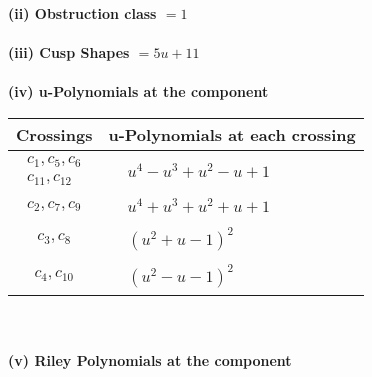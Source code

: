 \documentclass[1p]{elsarticle_modified}
\theoremstyle{definition}
\begin{document}
\flushleft \textbf{(ii) Obstruction class $= 1$}\\~\\
\flushleft \textbf{(iii) Cusp Shapes $= 5 u+11$}\\~\\
\newpage\renewcommand{\arraystretch}{1}
\flushleft \textbf{(iv) u-Polynomials at the component}\newline \\
\begin{tabular}{m{50pt}|m{274pt}}
Crossings & \hspace{64pt}u-Polynomials at each crossing \\
\hline $$\begin{aligned}c_{1},c_{5},c_{6}\\c_{11},c_{12}\end{aligned}$$&$\begin{aligned}
&u^4- u^3+u^2- u+1
\end{aligned}$\\
\hline $$\begin{aligned}c_{2},c_{7},c_{9}\end{aligned}$$&$\begin{aligned}
&u^4+u^3+u^2+u+1
\end{aligned}$\\
\hline $$\begin{aligned}c_{3},c_{8}\end{aligned}$$&$\begin{aligned}
&(u^2+u-1)^2
\end{aligned}$\\
\hline $$\begin{aligned}c_{4},c_{10}\end{aligned}$$&$\begin{aligned}
&(u^2- u-1)^2
\end{aligned}$\\
\hline
\end{tabular}\\~\\
\newpage\renewcommand{\arraystretch}{1}
\flushleft \textbf{(v) Riley Polynomials at the component}\newline \\
\end{document}
